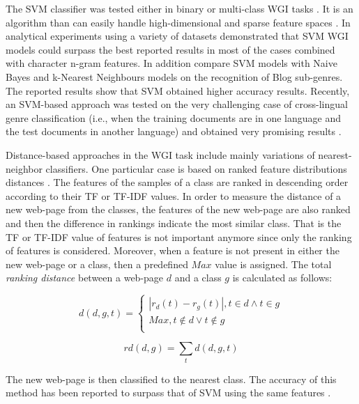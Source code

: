 The SVM classifier was tested either in binary or multi-class WGI tasks \parencite{dai2018fine}. It is an algorithm than can easily handle high-dimensional and sparse feature spaces \parencite{joachims1997probabilistic}. In  analytical experiments using a variety of datasets demonstrated that SVM WGI models could surpass the best reported results in most of the cases combined with character n-gram features. In addition \parencite{virik2017blog} compare SVM models with Naive Bayes and k-Nearest Neighbours models on the recognition of Blog sub-genres. The reported results show that SVM obtained higher accuracy results. Recently, an SVM-based approach was tested on the very challenging case of cross-lingual genre classification (i.e., when the training documents are in one language and the test documents in another language) and obtained very promising results \parencite{nguyen2019cross}. 

Distance-based approaches in the WGI task include mainly variations of nearest-neighbor classifiers. One particular case is based on ranked feature distributions distances \parencite{waltinger2010feature}. The features of the samples of a class are ranked in descending order according to their TF or TF-IDF values. In order to measure the distance of a new web-page from the classes, the features of the new web-page are also ranked and then the difference in rankings indicate the most similar class. That is the TF or TF-IDF value of features is not important anymore since only the ranking of features is considered. Moreover, when a feature is not present in either the new web-page or a class, then a predefined $Max$ value is assigned. The total \textit{ranking distance} between a web-page $d$ and a class $g$ is calculated as follows:

\begin{equation}\label{eq:ranking_distance}
	d(d,g,t) =
      \begin{cases}
      	| r_{d}(t) - r_{g}(t) |, t \in d \wedge t \in g  \\
        Max, t \notin d \vee t \notin g \\ 
       \end{cases}
\end{equation}

\begin{equation}\label{eq:ranking_distance_sum}
	rd(d,g) = \sum_{t} d(d,g,t)
\end{equation}

The new web-page is then classified to the nearest class. The accuracy of this method has been reported to surpass that of SVM using the same features \parencite{waltinger2010feature}.

